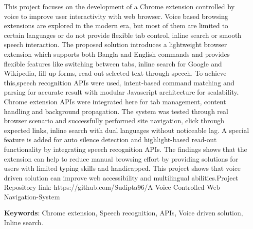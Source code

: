 
		This project focuses on the development of a Chrome extension controlled by voice to improve user interactivity with web browser. Voice based browsing extensions are explored in the modern era, but most of them are limited to certain languages or do not provide flexible tab control, inline search or smooth speech interaction. The proposed solution introduces a lightweight browser extension which supports both Bangla and English commands and provides flexible features like switching between tabs, inline search for Google and Wikipedia, fill up forms, read out selected text through speech. To achieve this,speech recognition APIs were used, intent-based command matching and parsing for accurate result with modular Javascript architecture for scalability. Chrome extension APIs were integrated here for tab management, content handling and background propagation. The system was tested through real browser scenario and successfully performed site navigation, click through expected links, inline search with dual languages without noticeable lag. A special feature is added for auto silence detection and highlight-based read-out functionality by integrating speech recognition APIs. The findings shows that the extension can help to reduce manual browsing effort by providing solutions for users with limited typing skills and handicapped. This project shows that voice driven solution can improve web accessibility and multilingual abilities.Project Repository link: https://github.com/Sudipta96/A-Voice-Controlled-Web-Navigation-System
		
		\vspace{8pt}
		\textbf{Keywords}: Chrome extension, Speech recognition, APIs, Voice driven solution, Inline search.

	







































